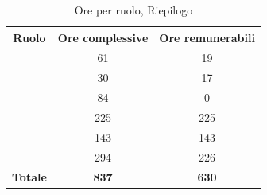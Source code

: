 \begin{table}[H]
	\begin{center}
		\begin{tabular}{|c|c|c|}
			\hline
			\textbf{Ruolo}	& \textbf{Ore complessive} & \textbf{Ore remunerabili} \\
			\hline
			\Res	&	61	&	19	\\
			\hline
			\Amm	&	30	&	17	\\
			\hline
			\Ana	&	84	&	0	\\
			\hline
			\Prog	&	225	&	225	\\
			\hline
			\Progr	&	143	&	143	\\
			\hline
			\Ver	&	294	&	226	\\
			\hline
			\textbf{Totale} & \textbf{837} & \textbf{630} \\
			\hline
		\end{tabular}
	\end{center}
	\caption{Ore per ruolo, Riepilogo}
\end{table}

